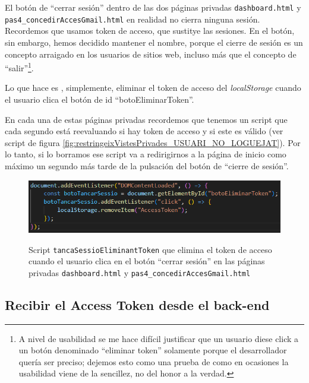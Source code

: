 \documentclass[a4paper,12pt]{report}
\begin{document}
	El botón de ``cerrar sesión'' dentro de las dos páginas privadas \texttt{dashboard.html} y \texttt{pas4\_concedirAccesGmail.html} en realidad no cierra ninguna sesión. Recordemos que usamos token de acceso, que sustitye las sesiones. En el botón, sin embargo, hemos decidido mantener el nombre, porque el cierre de sesión es un concepto arraigado en los usuarios de sitios web, incluso más que el concepto de ``salir''\footnote{A nivel de usabilidad se me hace difícil justificar que un usuario diese click a un botón denominado ``eliminar token'' solamente porque el desarrollador quería ser preciso; dejemos esto como una prueba de como en ocasiones la usabilidad viene de la sencillez, no del honor a la verdad.}. 
	
	Lo que hace es , simplemente, eliminar el token de acceso del \textit{localStorage} cuando el usuario clica el botón de id ``botoEliminarToken''. 
	
	En cada una de estas páginas privadas recordemos que tenemos un script que cada segundo está reevaluando si hay token de acceso y si este es válido (ver script de figura \ref{fig:restringeixVistesPrivades_USUARI_NO_LOGUEJAT}). Por lo tanto, si lo borramos ese script va a redirigirnos a la página de inicio como máximo un segundo más tarde de la pulsación del botón de ``cierre de sesión''.
	
	\FloatBarrier
	\setlength{\abovecaptionskip}{15pt}
	\begin{figure}[H]
		\centering
		\caption{Script \texttt{tancaSessioEliminantToken} que elimina el token de acceso cuando el usuario clica en el botón ``cerrar sesión'' en las páginas privadas \texttt{dashboard.html} y \texttt{pas4\_concedirAccesGmail.html}}
		\includegraphics[width=1\linewidth]{img/scriptTancarSessio.png}
		\label{fig:scriptTancarSessio}
	\end{figure}
	\FloatBarrier
	
	
	
	\subsection{Recibir el Access Token desde el back-end}
	\label{sec:recibirAccesTokenENFRONTEND}
	
\end{document}
